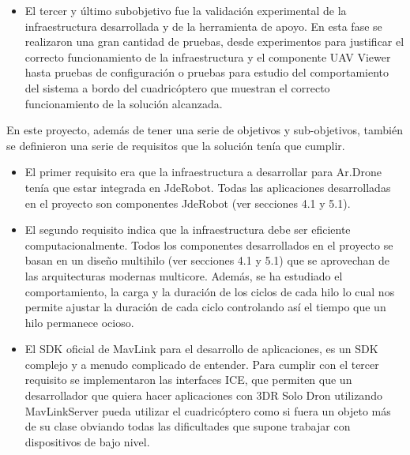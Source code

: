 \begin{itemize}
Ademas, se encontro la problematica que la interfaz ya existente, se diferenciaba mucho de un control de dron habitual, este cambio acerca a gente interesada en drones a la plataforma JdeRobot de una manera más simple. Este componente ya ha sido probado y utilizado en el Trabajo Fin de Grado de Jorge Vela \footnote{\url{http://jderobot.org/Jvela-tfg}}.

\item El tercer y último subobjetivo fue la validación experimental de la infraestructura desarrollada y de la herramienta de apoyo. En esta fase se realizaron una gran cantidad de pruebas, desde experimentos para justificar el correcto funcionamiento de la infraestructura y el componente UAV Viewer hasta pruebas de configuración o pruebas para estudio del comportamiento del sistema a bordo del cuadricóptero que muestran el correcto funcionamiento de la solución alcanzada.

\end{itemize}

En este proyecto, además de tener una serie de objetivos y sub-objetivos, también se definieron una serie de requisitos que la solución tenía que cumplir.

\begin{itemize}
\item El primer requisito era que la infraestructura a desarrollar para Ar.Drone tenía que estar integrada en JdeRobot. Todas las aplicaciones desarrolladas en el proyecto son componentes JdeRobot (ver secciones 4.1 y 5.1).
\item El segundo requisito indica que la infraestructura debe ser eficiente computacionalmente. Todos los componentes desarrollados en el proyecto se basan en un diseño multihilo (ver secciones 4.1 y 5.1) que se aprovechan de las arquitecturas modernas multicore. Además, se ha estudiado el comportamiento, la carga y la duración de los ciclos de cada hilo lo cual nos permite ajustar la
duración de cada ciclo controlando así el tiempo que un hilo permanece ocioso.
\item El SDK oficial de MavLink para el desarrollo de aplicaciones, es un SDK complejo y a menudo complicado de entender. Para cumplir con el tercer requisito se implementaron las interfaces ICE, que permiten que un desarrollador que quiera hacer aplicaciones con 3DR Solo Dron utilizando MavLinkServer pueda utilizar el cuadricóptero como si fuera un objeto más de su clase obviando todas las dificultades que supone trabajar con dispositivos de bajo nivel.

\end{itemize}

